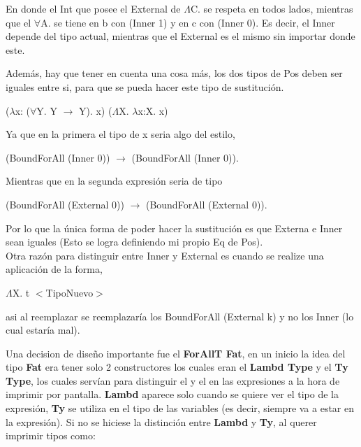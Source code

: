 \documentclass[12pt, titlepage, a4paper]{article}
\begin{document}
\begin{itemize}[label=$\bullet$]
{  En donde el Int que posee el External de $\Lambda$C. se respeta en todos lados, mientras que el $\forall$A. se tiene en b con (Inner 1) y en c con (Inner 0). 
  Es decir, el Inner depende del tipo actual, mientras que el External es el mismo sin importar donde este.

  Además, hay que tener en cuenta una cosa más, los dos tipos de Pos deben ser iguales entre si, para que se pueda hacer este tipo 
  de sustitución.
  
  \begin{center}
    ($\lambda$x: ($\forall$Y. Y $\rightarrow$ Y). x) ($\Lambda$X. $\lambda$x:X. x)
  \end{center} 

  Ya que en la primera el tipo de x seria algo del estilo,
  \begin{center}
    (BoundForAll (Inner 0)) $\rightarrow$ (BoundForAll (Inner 0)). 
  \end{center}
  Mientras que en la segunda expresión seria de tipo 
  \begin{center}
    (BoundForAll (External 0)) $\rightarrow$ (BoundForAll (External 0)). 
  \end{center}
  
  Por lo que la única forma de poder hacer la sustitución es que Externa e Inner sean iguales (Esto 
  se logra definiendo mi propio Eq de Pos). \\

  Otra razón para distinguir entre Inner y External es cuando se realize una aplicación de la forma,
  \begin{center}
    $\Lambda$X. t $<$TipoNuevo$>$
  \end{center} 
   asi al reemplazar se reemplazaría los BoundForAll (External k) y no los Inner (lo cual estaría mal).
  }
  \end{itemize}

  Una decision de diseño importante fue el \textbf{ForAllT Fat}, en un inicio la idea del tipo \textbf{Fat} era tener solo 2 
  constructores los cuales eran el \textbf{Lambd Type} y el \textbf{Ty Type}, los cuales servían para distinguir el 
  \say{$\Lambda$} y el \say{$\forall$} en las expresiones a la hora de imprimir por pantalla. \textbf{Lambd} aparece solo cuando se quiere ver el tipo de 
  la expresión, \textbf{Ty} se utiliza en el tipo de las variables 
  (es decir, siempre va a estar en la expresión). Si no se hiciese la distinción entre \textbf{Lambd} y  \textbf{Ty}, al querer imprimir tipos como:
\end{document}
